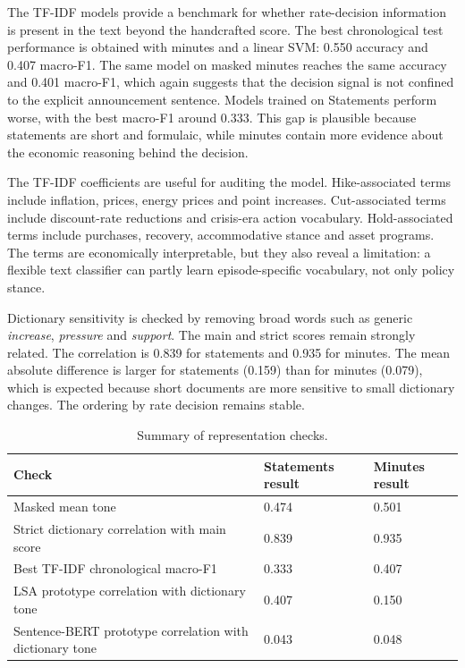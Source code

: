 \documentclass{article}
\begin{document}
The TF-IDF models provide a benchmark for whether rate-decision information is
present in the text beyond the handcrafted score. The best chronological test
performance is obtained with minutes and a linear SVM: 0.550 accuracy and 0.407
macro-F1. The same model on masked minutes reaches the same accuracy and 0.401
macro-F1, which again suggests that the decision signal is not confined to the
explicit announcement sentence. Models trained on Statements perform worse, with the best
macro-F1 around 0.333. This gap is plausible because statements are short and
formulaic, while minutes contain more evidence about the economic reasoning behind
the decision.

The TF-IDF coefficients are useful for auditing the model. Hike-associated terms
include inflation, prices, energy prices and point increases. Cut-associated terms
include discount-rate reductions and crisis-era action vocabulary. Hold-associated
terms include purchases, recovery, accommodative stance and asset programs. The
terms are economically interpretable, but they also reveal a limitation: a flexible
text classifier can partly learn episode-specific vocabulary, not only policy
stance.

Dictionary sensitivity is checked by removing broad words such as generic
\emph{increase}, \emph{pressure} and \emph{support}. The main and strict scores
remain strongly related. The correlation is 0.839 for statements and 0.935 for
minutes. The mean absolute difference is larger for statements (0.159) than for
minutes (0.079), which is expected because short documents are more sensitive to
small dictionary changes. The ordering by rate decision remains stable.

\begin{table}[t]
\centering
\caption{Summary of representation checks.}
\label{tab:robustness}
\begin{tabular}{p{}p{}p{}}
\toprule
Check & Statements result & Minutes result \\
\midrule
Masked mean tone & 0.474 & 0.501 \\
Strict dictionary correlation with main score & 0.839 & 0.935 \\
Best TF-IDF chronological macro-F1 & 0.333 & 0.407 \\
LSA prototype correlation with dictionary tone & 0.407 & 0.150 \\
Sentence-BERT prototype correlation with dictionary tone & 0.043 & 0.048 \\
\bottomrule
\end{tabular}
\end{table}
\end{document}
